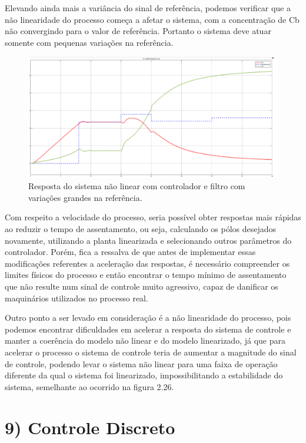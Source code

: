 \documentclass[a4paper,12pt]{report}
\begin{document}
Elevando ainda mais a variância do sinal de referência, podemos verificar que a não linearidade do processo começa a afetar o sistema, com a concentração de Cb não convergindo para o valor de referência. Portanto o sistema deve atuar somente com pequenas variações na referência. 

\begin{figure}[H]
    \centering
    \includegraphics[width=0.8\linewidth]{respostaaosistemanaolinear.png}
    \caption{Resposta do sistema não linear com controlador e filtro com variações grandes na referência.}
    \label{fig:enter-label}
\end{figure}

Com respeito a velocidade do processo, seria possível obter respostas mais rápidas ao reduzir o tempo de assentamento, ou seja, calculando os pólos desejados novamente, utilizando a planta linearizada e selecionando outros parâmetros do controlador. Porém, fica a ressalva de que antes de implementar essas modificações referentes a aceleração das respostas, é necessário compreender os limites físicos do processo e então encontrar o tempo mínimo de assentamento que não resulte num sinal de controle muito agressivo, capaz de danificar os maquinários utilizados no processo real.

 Outro ponto a ser levado em consideração é a não linearidade do processo, pois podemos encontrar dificuldades em acelerar a resposta do sistema de controle e manter a coerência do modelo não linear e do modelo linearizado, já que para acelerar o processo o sistema de controle teria de aumentar a magnitude do sinal de controle, podendo levar o sistema não linear para uma faixa de operação diferente da qual o sistema foi linearizado, impossibilitando a estabilidade do sistema, semelhante ao ocorrido na figura 2.26.


\section{9) Controle Discreto}
\end{document}

